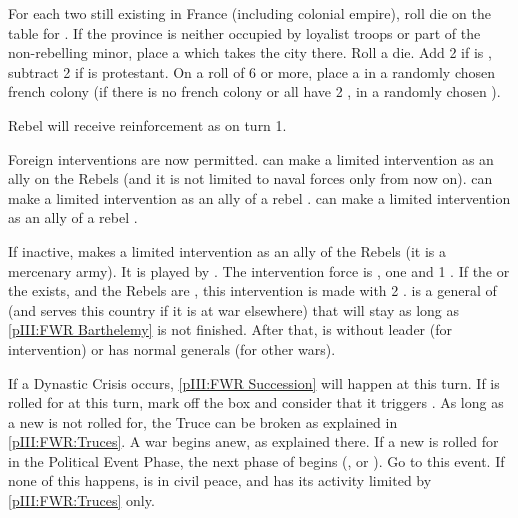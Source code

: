 \begin{digressions}
  \phevnt
  \bparag For each two \REVOLT still existing in France (including colonial
  empire), roll die on the \REVOLT table for \FRA. If the province is neither
  occupied by loyalist troops or part of the non-rebelling minor, place a
  \REVOLT \facemoins which takes the city there.
  \bparag Roll a die. Add 2 if \FRA is \CATHCR, subtract 2 if \FRA is
  protestant. On a roll of 6 or more, place a \REVOLT \facemoins in a randomly
  chosen french colony (if there is no french colony or all have 2 \REVOLT
  \faceplus, in a randomly chosen \TP).

  \phadm
  \aparag Rebel will receive reinforcement as on turn 1.

  \phdipl
  \aparag Foreign interventions are now permitted.
  \aparag \REB can make a limited intervention as an ally on the Rebels (and
  it is not limited to naval forces only from now on).
  \aparag \HOL can make a limited intervention as an ally of a rebel \hug.
  \aparag \SPA can make a limited intervention as an ally of a rebel \lig.

  \phmil
  \label{pIII:FWR:Palatinate} If
  inactive, \paysPalatinat makes a limited intervention as an ally of the
  Rebels (it is a mercenary army). It is played by \REB. The intervention
  force is , one \ARMY \faceplus and 1 \DT.  If the
   or the 
  exists, and the Rebels are \hug, this intervention is made with 2 \ARMY
  \faceplus.   is a general of \paysPalatinat (and serves
  this country if it is at war elsewhere) that will stay as long as
  \ref{pIII:FWR Barthelemy} is not finished.  After that, \paysPalatinat is
  without leader (for intervention) or has normal generals (for other wars).




  \phevnt
  \aparag If a Dynastic Crisis occurs, \ref{pIII:FWR Succession} will happen
  at this turn. If  is rolled for at this turn, mark off
  the box and consider that it triggers .
  \aparag As long as a new  is not rolled for, the Truce
  can be broken as explained in \ref{pIII:FWR:Truces}. A war begins anew, as
  explained there.
  \aparag If a new  is rolled for in the Political Event
  Phase, the next phase of  begins (,  or ). Go to this event.
  \aparag If none of this happens, \FRA is in civil peace, and has its
  activity limited by \ref{pIII:FWR:Truces} only.


\end{digressions}

